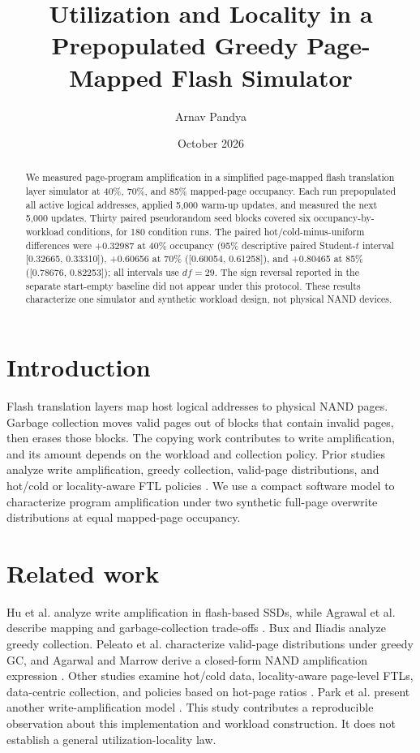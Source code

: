 \documentclass[11pt]{article}
\title{Utilization and Locality in a Prepopulated Greedy Page-Mapped Flash Simulator}
\author{Arnav Pandya}
\date{October 2026}
\begin{document}
\maketitle

\begin{abstract}
We measured page-program amplification in a simplified page-mapped flash translation layer simulator at 40\%, 70\%, and 85\% mapped-page occupancy. Each run prepopulated all active logical addresses, applied 5,000 warm-up updates, and measured the next 5,000 updates. Thirty paired pseudorandom seed blocks covered six occupancy-by-workload conditions, for 180 condition runs. The paired hot/cold-minus-uniform differences were +0.32987 at 40\% occupancy (95\% descriptive paired Student-$t$ interval [0.32665, 0.33310]), +0.60656 at 70\% ([0.60054, 0.61258]), and +0.80465 at 85\% ([0.78676, 0.82253]); all intervals use $df=29$. The sign reversal reported in the separate start-empty baseline did not appear under this protocol. These results characterize one simulator and synthetic workload design, not physical NAND devices.
\end{abstract}

\section{Introduction}
Flash translation layers map host logical addresses to physical NAND pages. Garbage collection moves valid pages out of blocks that contain invalid pages, then erases those blocks. The copying work contributes to write amplification, and its amount depends on the workload and collection policy. Prior studies analyze write amplification, greedy collection, valid-page distributions, and hot/cold or locality-aware FTL policies \cite{hu2009waf,agrawal2008design,bux2010greedy,peleato2012valid,agarwal2010closed,vanhoudt2013hotcold,chen2019hcftl,wang2015datacentric,kang2015hotpages,park2019model}. We use a compact software model to characterize program amplification under two synthetic full-page overwrite distributions at equal mapped-page occupancy.

\section{Related work}
Hu et al. analyze write amplification in flash-based SSDs, while Agrawal et al. describe mapping and garbage-collection trade-offs \cite{hu2009waf,agrawal2008design}. Bux and Iliadis analyze greedy collection. Peleato et al. characterize valid-page distributions under greedy GC, and Agarwal and Marrow derive a closed-form NAND amplification expression \cite{bux2010greedy,peleato2012valid,agarwal2010closed}. Other studies examine hot/cold data, locality-aware page-level FTLs, data-centric collection, and policies based on hot-page ratios \cite{vanhoudt2013hotcold,chen2019hcftl,wang2015datacentric,kang2015hotpages}. Park et al. present another write-amplification model \cite{park2019model}. This study contributes a reproducible observation about this implementation and workload construction. It does not establish a general utilization-locality law.
\end{document}
